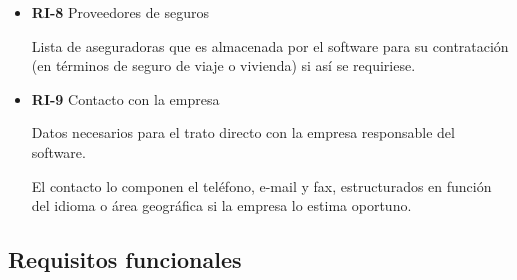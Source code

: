 \documentclass[11pt,spanish]{article} %
\begin{document}
\begin{itemize}
	\item \textbf{RI-8} Proveedores de seguros
	
	Lista de aseguradoras que es almacenada por el software para su contratación (en términos de seguro de viaje o vivienda) si así se requiriese.
	
	\item \textbf{RI-9} Contacto con la empresa
	
	Datos necesarios para el trato directo con la empresa responsable del software.
	
	El contacto lo componen el teléfono, e-mail y fax, estructurados en función del idioma o área geográfica si la empresa lo estima oportuno.
	
\end{itemize}

\subsection{Requisitos funcionales}
\end{document}
